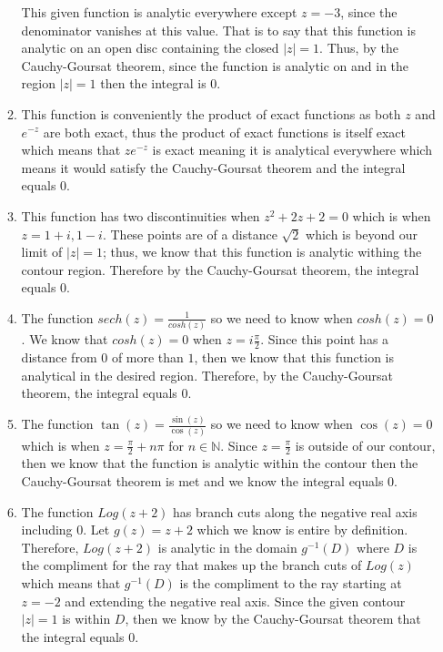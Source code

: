 \documentclass{article}
\theoremstyle{definition}
\newcommand{\N}{\mathbb{N}}
\begin{document}
\begin{enumerate}
\begin{enumerate}
        This given function is analytic everywhere except $z = -3$, since the denominator vanishes at this value. That is to say that this function is analytic on an open disc containing the closed $|z| = 1$. Thus, by the Cauchy-Goursat theorem, since the function is analytic on and in the region $|z| = 1$ then the integral is $0.$
        
        \item
        
        This function is conveniently the product of exact functions as both $z$ and $e^{-z}$ are both exact, thus the product of exact functions is itself exact which means that $ze^{-z}$ is exact meaning it is analytical everywhere which means it would satisfy the Cauchy-Goursat theorem and the integral equals $0$.
        
        \item
        
        This function has two discontinuities when $z^2 + 2z + 2 = 0$ which is when $z = 1 + i, 1 - i$. These points are of a distance $\sqrt{2}$ which is beyond our limit of $|z| = 1$; thus, we know that this function is analytic withing the contour region. Therefore by the Cauchy-Goursat theorem, the integral equals $0$.
        
        \item
        
        The function $sech(z) = \frac{1}{cosh(z)}$ so we need to know when $cosh(z) = 0$. We know that $cosh(z) = 0$ when $z = i\frac{\pi}{2}$. Since this point has a distance from $0$ of more than $1$, then we know that this function is analytical in the desired region. Therefore, by the Cauchy-Goursat theorem, the integral equals $0$.
        
        \item
        
        The function $\tan(z) = \frac{\sin(z)}{\cos(z)}$ so we need to know when $\cos(z) = 0$ which is when $z = \frac{\pi}{2} + n\pi$ for $n \in \N$. Since $z = \frac{\pi}{2}$ is outside of our contour, then we know that the function is analytic within the contour then the Cauchy-Goursat theorem is met and we know the integral equals $0.$
        
        \item
        
        The function $Log(z + 2)$ has branch cuts along the negative real axis including $0$. Let $g(z) = z + 2$ which we know is entire by definition. Therefore, $Log(z + 2)$ is analytic in the domain $g^{-1}(D)$ where $D$ is the compliment for the ray that makes up the branch cuts of $Log(z)$ which means that $g^{-1}(D)$ is the compliment to the ray starting at $z = -2$ and extending the negative real axis. Since the given contour $|z| = 1$ is within $D$, then we know by the Cauchy-Goursat theorem that the integral equals $0.$
        

\end{enumerate}
\end{enumerate}
\end{document}

